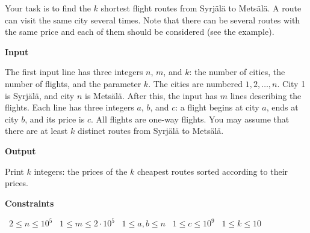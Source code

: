 Your task is to find the $k$ shortest flight routes from Syrjälä to Metsälä. A route can visit the same city several times.
Note that there can be several routes with the same price and each of them should be considered (see the example).

\vspace{0.3cm}\noindent\textbf{Input}

The first input line has three integers $n$, $m$, and $k$: the number of cities, the number of flights, and the parameter $k$. The cities are numbered $1,2,\ldots,n$. City 1 is Syrjälä, and city $n$ is Metsälä.
After this, the input has $m$ lines describing the flights. Each line has three integers $a$, $b$, and $c$: a flight begins at city $a$, ends at city $b$, and its price is $c$. All flights are one-way flights.
You may assume that there are at least $k$ distinct routes from Syrjälä to Metsälä.

\vspace{0.3cm}\noindent\textbf{Output}

Print $k$ integers: the prices of the $k$ cheapest routes sorted according to their prices.

\vspace{0.3cm}\noindent\textbf{Constraints}

\textbullet\ $2 \le n \le 10^5$
\textbullet\ $1 \le m \le 2 \cdot 10^5$
\textbullet\ $1 \le a,b \le n$
\textbullet\ $1 \le c \le 10^9$
\textbullet\ $1 \le k \le 10$